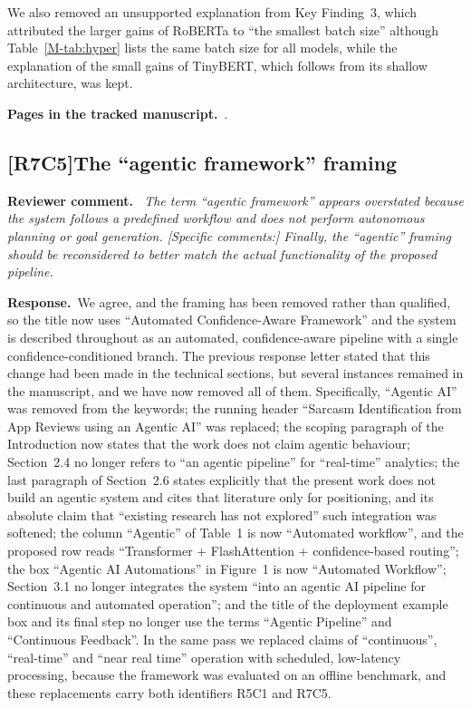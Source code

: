 \documentclass[11pt,a4paper]{article}
\newcommand{\comment}[3]{\subsection*{\textcolor{#1}{[#2]}\enspace #3}}
\newenvironment{reviewercomment}{\par\noindent\textbf{Reviewer comment.}\itshape\ }{\par}
\newcommand{\response}{\par\noindent\textbf{Response.}\ }
\newcommand{\where}[1]{\par\noindent\textbf{Pages in the tracked manuscript.}\ \rvpages[M-]{#1}.}
\begin{document}
We also removed an unsupported explanation from Key Finding~3, which attributed the larger gains of RoBERTa to ``the smallest batch size'' although Table~\ref{M-tab:hyper} lists the same batch size for all models, while the explanation of the small gains of TinyBERT, which follows from its shallow architecture, was kept.

\where{R7C4}

\comment{rvBoth}{R7C5}{The ``agentic framework'' framing}
\begin{reviewercomment}
The term ``agentic framework'' appears overstated because the system follows a predefined workflow and does not perform autonomous planning or goal generation. [Specific comments:] Finally, the ``agentic'' framing should be reconsidered to better match the actual functionality of the proposed pipeline.
\end{reviewercomment}
\response We agree, and the framing has been removed rather than qualified, so the title now uses ``Automated Confidence-Aware Framework'' and the system is described throughout as an automated, confidence-aware pipeline with a single confidence-conditioned branch. The previous response letter stated that this change had been made in the technical sections, but several instances remained in the manuscript, and we have now removed all of them. Specifically, ``Agentic AI'' was removed from the keywords; the running header ``Sarcasm Identification from App Reviews using an Agentic AI'' was replaced; the scoping paragraph of the Introduction now states that the work does not claim agentic behaviour; Section~2.4 no longer refers to ``an agentic pipeline'' for ``real-time'' analytics; the last paragraph of Section~2.6 states explicitly that the present work does not build an agentic system and cites that literature only for positioning, and its absolute claim that ``existing research has not explored'' such integration was softened; the column ``Agentic'' of Table~1 is now ``Automated workflow'', and the proposed row reads ``Transformer + FlashAttention + confidence-based routing''; the box ``Agentic AI Automations'' in Figure~1 is now ``Automated Workflow''; Section~3.1 no longer integrates the system ``into an agentic AI pipeline for continuous and automated operation''; and the title of the deployment example box and its final step no longer use the terms ``Agentic Pipeline'' and ``Continuous Feedback''. In the same pass we replaced claims of ``continuous'', ``real-time'' and ``near real time'' operation with scheduled, low-latency processing, because the framework was evaluated on an offline benchmark, and these replacements carry both identifiers R5C1 and R7C5.
\end{document}
